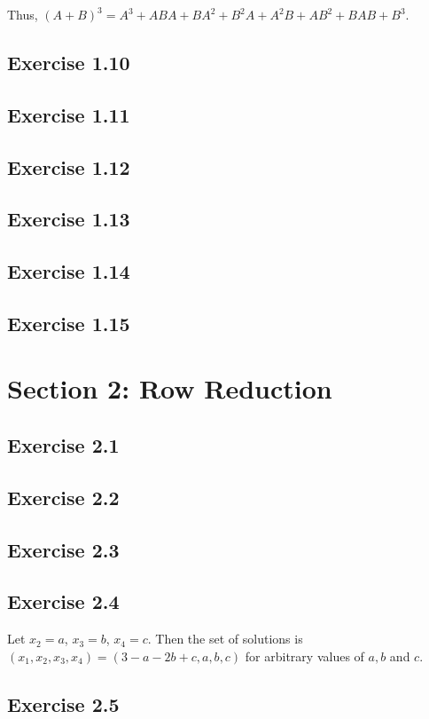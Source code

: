 \documentclass{article}
\begin{document}
Thus, $(A+B)^3 = A^3 + ABA + BA^2 + B^2A + A^2B + AB^2 + BAB + B^3$.

\subsection*{Exercise 1.10}
\subsection*{Exercise 1.11}
\subsection*{Exercise 1.12}
\subsection*{Exercise 1.13}
\subsection*{Exercise 1.14}
\subsection*{Exercise 1.15}


\section*{Section 2: Row Reduction}

\subsection*{Exercise 2.1}
\subsection*{Exercise 2.2}
\subsection*{Exercise 2.3}
\subsection*{Exercise 2.4}

Let $x_2=a$, $x_3=b$, $x_4=c$. Then the set of solutions is $(x_1,x_2,x_3,x_4)=(3-a-2b+c,a,b,c)$ for arbitrary values of $a,b$ and $c$.

\subsection*{Exercise 2.5}
\end{document}
